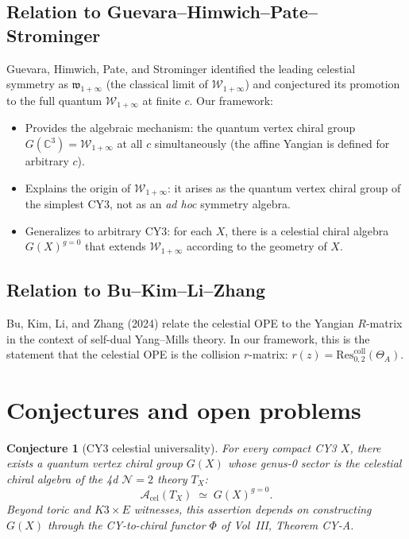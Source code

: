 \documentclass[11pt]{article}
\newtheorem{conjecture}[theorem]{Conjecture}
\theoremstyle{definition}
\theoremstyle{remark}
\newcommand{\cA}{\mathcal{A}}
\newcommand{\cW}{\mathcal{W}}
\newcommand{\Res}{\mathrm{Res}}
\begin{document}
\subsection{Relation to Guevara--Himwich--Pate--Strominger}

Guevara, Himwich, Pate, and Strominger identified the leading
celestial symmetry as $\mathfrak{w}_{1+\infty}$ (the classical
limit of $\cW_{1+\infty}$) and conjectured its promotion to the
full quantum $\cW_{1+\infty}$ at finite $c$. Our framework:

\begin{itemize}
\item Provides the algebraic mechanism: the quantum vertex chiral
 group $G(\mathbb{C}^3) = \cW_{1+\infty}$ at all $c$ simultaneously
 (the affine Yangian is defined for arbitrary $c$).
\item Explains the origin of $\cW_{1+\infty}$: it arises as the
 quantum vertex chiral group of the simplest CY3, not as an
 \emph{ad hoc} symmetry algebra.
\item Generalizes to arbitrary CY3: for each $X$, there is a
 celestial chiral algebra $G(X)^{g=0}$ that extends
 $\cW_{1+\infty}$ according to the geometry of $X$.
\end{itemize}

\subsection{Relation to Bu--Kim--Li--Zhang}

Bu, Kim, Li, and Zhang (2024) relate the celestial OPE to the
Yangian $R$-matrix in the context of self-dual Yang--Mills theory.
In our framework, this is the statement that the celestial OPE
is the collision $r$-matrix:
$r(z) = \Res^{\mathrm{coll}}_{0,2}(\Theta_A)$.

\section{Conjectures and open problems}
\label{sec:conjectures}

\begin{conjecture}[CY3 celestial universality]
\label{conj:cy3-universality}
For every compact CY3 $X$, there exists a quantum vertex chiral
group $G(X)$ whose genus-0 sector is the celestial chiral algebra
of the 4d $\mathcal{N}=2$ theory $T_X$:
\[
\cA_{\mathrm{cel}}(T_X)
\;\simeq\;
G(X)^{g=0}.
\]
Beyond toric and $K3 \times E$ witnesses, this assertion depends on
constructing $G(X)$ through the CY-to-chiral functor $\Phi$ of Vol~III,
Theorem CY-A.
\end{conjecture}
\end{document}

